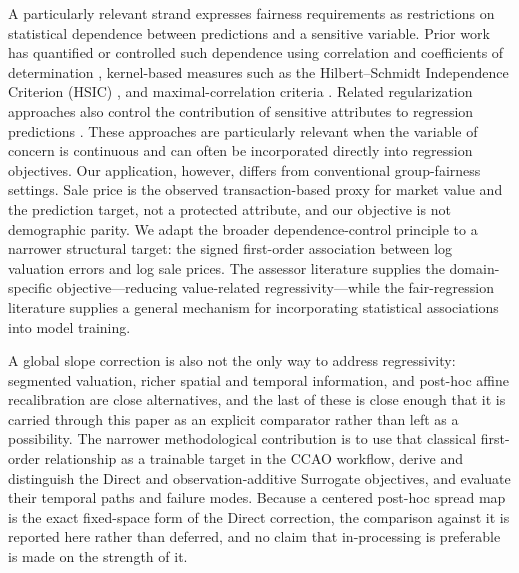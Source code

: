 \documentclass[10pt]{article}
\theoremstyle{definition}
\newcommand{\1}{\mathbf{1}}
\begin{document}
{A particularly relevant strand expresses fairness requirements as restrictions on statistical dependence between predictions and a sensitive variable.} {Prior work has quantified or controlled such dependence using correlation and coefficients of determination \cite{KomiyamaEtAl2018}, kernel-based measures such as the Hilbert--Schmidt Independence Criterion (HSIC) \cite{PerezSuayEtAl2017,LiEtAl2022Fairness}, and maximal-correlation criteria \cite{MaryEtAl2019,lee2022maximal}. Related regularization approaches also control the contribution of sensitive attributes to regression predictions \cite{ScutariPaneroProissl2022}.}
{These approaches are particularly relevant when the variable of concern is continuous and can often be incorporated directly into regression objectives. Our application, however, differs from conventional group-fairness settings. Sale price is the observed transaction-based proxy for market value and the prediction target, not a protected attribute, and our objective is not demographic parity. We adapt the broader dependence-control principle to a narrower structural target: the signed first-order association between log valuation errors and log sale prices. The assessor literature supplies the domain-specific objective---reducing value-related regressivity---while the fair-regression literature supplies a general mechanism for incorporating statistical associations into model training.}

A global slope correction is also not the only way to address regressivity: segmented valuation, richer spatial and temporal information, and post-hoc affine recalibration \cite{BeheshtiEtAl2019} are close alternatives, and the last of these is close enough that it is carried through this paper as an explicit comparator rather than left as a possibility. The narrower methodological contribution is to use that classical first-order relationship as a trainable target in the CCAO workflow, derive and distinguish the Direct and observation-additive Surrogate objectives, and evaluate their temporal paths and failure modes. Because a centered post-hoc spread map is the exact fixed-space form of the Direct correction, the comparison against it is reported here rather than deferred, and no claim that in-processing is preferable is made on the strength of it.
\end{document}
